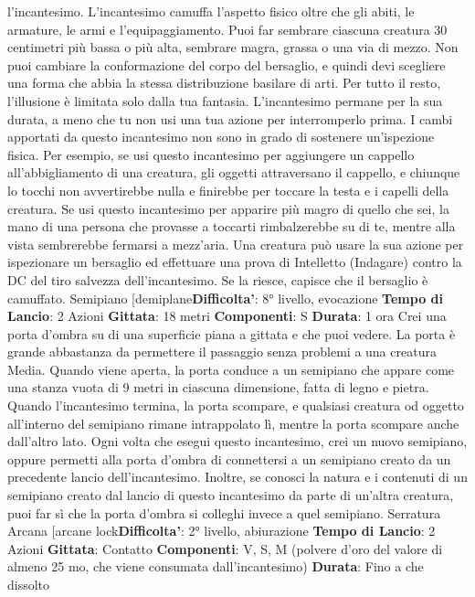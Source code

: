 \begin{multicols}{2}
l’incantesimo.
L’incantesimo camuffa l’aspetto fisico oltre che gli abiti,
le armature, le armi e l’equipaggiamento. Puoi far
sembrare ciascuna creatura 30 centimetri più bassa o
più alta, sembrare magra, grassa o una via di mezzo.
Non puoi cambiare la conformazione del corpo del
bersaglio, e quindi devi scegliere una forma che abbia
la stessa distribuzione basilare di arti. Per tutto il resto,
l’illusione è limitata solo dalla tua fantasia.
L’incantesimo permane per la sua durata, a meno che
tu non usi una tua azione per interromperlo prima.
I cambi apportati da questo incantesimo non sono in
grado di sostenere un’ispezione fisica. Per esempio, se
usi questo incantesimo per aggiungere un cappello
all’abbigliamento di una creatura, gli oggetti
attraversano il cappello, e chiunque lo tocchi non
avvertirebbe nulla e finirebbe per toccare la testa e i
capelli della creatura. Se usi questo incantesimo per
apparire più magro di quello che sei, la mano di una
persona che provasse a toccarti rimbalzerebbe su di te,
mentre alla vista sembrerebbe fermarsi a mezz’aria.
Una creatura può usare la sua azione per ispezionare
un bersaglio ed effettuare una prova di Intelletto
(Indagare) contro la DC del tiro salvezza 
dell’incantesimo. Se la riesce, capisce che il bersaglio è
camuffato.
Semipiano
[demiplane\textbf{Difficolta'}:
8° livello, evocazione
\textbf{Tempo di Lancio}: 2 Azioni
\textbf{Gittata}: 18 metri
\textbf{Componenti}: S
\textbf{Durata}: 1 ora
Crei una porta d’ombra su di una superficie piana a
gittata e che puoi vedere. La porta è grande
abbastanza da permettere il passaggio senza problemi
a una creatura Media. Quando viene aperta, la porta
conduce a un semipiano che appare come una stanza
vuota di 9 metri in ciascuna dimensione, fatta di legno e
pietra. Quando l’incantesimo termina, la porta
scompare, e qualsiasi creatura od oggetto all’interno del
semipiano rimane intrappolato lì, mentre la porta
scompare anche dall’altro lato.
Ogni volta che esegui questo incantesimo, crei un
nuovo semipiano, oppure permetti alla porta d’ombra di
connettersi a un semipiano creato da un precedente
lancio dell’incantesimo. Inoltre, se conosci la natura e i
contenuti di un semipiano creato dal lancio di questo
incantesimo da parte di un’altra creatura, puoi far sì che
la porta d’ombra si colleghi invece a quel semipiano.
Serratura Arcana
[arcane lock\textbf{Difficolta'}:
2° livello, abiurazione
\textbf{Tempo di Lancio}: 2 Azioni
\textbf{Gittata}: Contatto
\textbf{Componenti}: V, S, M (polvere d’oro del valore di
almeno 25 mo, che viene consumata dall’incantesimo)
\textbf{Durata}: Fino a che dissolto

\end{multicols}
